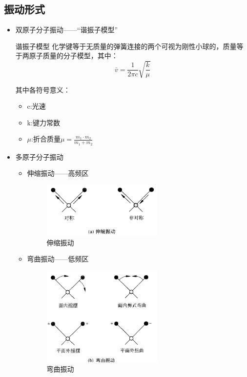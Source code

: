\subsection{振动形式}
\begin{itemize}
    \item 双原子分子振动——“谐振子模型”
    \begin{theorem*}{谐振子模型}
        化学键等于无质量的弹簧连接的两个可视为刚性小球的，质量等于两原子质量的分子模型，其中：
        \begin{equation*}
            \bar{v}=\frac{1}{2\pi c}\sqrt{\frac{k}{\mu}}
        \end{equation*}
        
        其中各符号意义：
            \begin{itemize}
                \item c:光速
                \item k:键力常数
                \item $\mu$:折合质量$\mu=\frac{m_{1}\cdot m_{2}}{m_{1}+m_{2}}$
            \end{itemize}
    \end{theorem*}
    \item 多原子分子振动
    \begin{itemize}
        \item 伸缩振动——高频区
        \begin{figure}[ht]
            \centering
            \includegraphics[width=6cm]{image/chp5_flex_vir.png}
            \caption{伸缩振动}
            \label{fig:flex}
       \end{figure}
        \item 弯曲振动——低频区
        \begin{figure}[ht]
            \centering
            \includegraphics[width=6cm]{image/chp5_twi_vir.png}
            \caption{弯曲振动}
            \label{fig:twist}
       \end{figure}
    \end{itemize}
\end{itemize}

